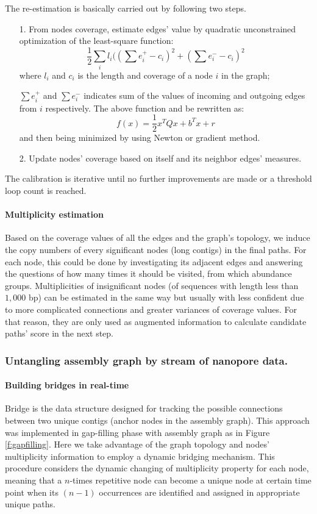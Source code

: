 The re-estimation is basically carried out by following two steps.
\begin{itemize}
\item[1.] From nodes coverage, estimate edges' value by quadratic unconstrained optimization of the least-square function:
\begin{equation}
\frac{1}{2}\sum_{i}{l_i((\sum{e^{+}_{i}}-c_i)^2+(\sum{e^{-}_{i}}-c_i)^2}
\end{equation}
where $l_i$ and $c_i$ is the length and coverage of a node $i$ in the graph;

$\sum{e^{+}_{i}}$ and $\sum{e^{-}_{i}}$ indicates sum of the values of incoming and outgoing edges from $i$ respectively. 
The above function and be rewritten as:
\begin{equation}
f(x)=\frac{1}{2}x^TQx + b^Tx + r
\end{equation}
and then being minimized by using Newton or gradient method.
\item[2.] Update nodes' coverage based on itself and its neighbor edges' measures.
\end{itemize}
The calibration is iterative until no further improvements are made or a threshold loop count is reached.
\paragraph{Multiplicity estimation}
Based on the coverage values of all the edges and the graph's topology, we induce the copy numbers of every significant nodes (long contigs) in the final paths.
For each node, this could be done by investigating its adjacent edges and answering the questions of how many times it should be visited, from which abundance groups.
Multiplicities of insignificant nodes (of sequences with length less than $1,000$ bp) can be estimated in the same way but usually with less confident due to more complicated connections and greater variances of coverage values. 
For that reason, they are only used as augmented information to calculate candidate paths' score in the next step.

\subsubsection{Untangling assembly graph by stream of nanopore data.}
\paragraph{Building bridges in real-time}
Bridge is the data structure designed for tracking the possible connections between two unique contigs (anchor nodes in the assembly graph). This approach was implemented in \npscarf{} gap-filling phase with assembly graph as in Figure \ref{f:gapfilling}.
Here we take advantage of the graph topology and nodes' multiplicity information to employ a dynamic bridging mechanism.
This procedure considers the dynamic changing of multiplicity property for each node, meaning that a $n$-times repetitive node can become a unique node at certain time point when its $(n-1)$ occurrences are identified and assigned in appropriate unique paths. 

